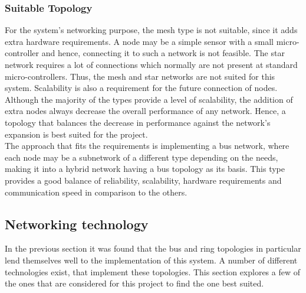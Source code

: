 \subsubsection*{Suitable Topology}
For the system's networking purpose, the mesh type is not suitable, since it adds extra hardware requirements.
A node may be a simple sensor with a small micro-controller and hence, connecting it to such a network is not feasible.
The star network requires a lot of connections which normally are not present at standard micro-controllers.
Thus, the mesh and star networks are not suited for this system.
Scalability is also a requirement for the future connection of nodes.
Although the majority of the types provide a level of scalability, the addition of extra nodes always decrease the overall performance of any network.
Hence, a topology that balances the decrease in performance against the network's expansion is best suited for the project.\\
The approach that fits the requirements is implementing a bus network, where each node may be a subnetwork of a different type depending on the needs, making it into a hybrid network having a bus topology as its basis.
This type provides a good balance of reliability, scalability, hardware requirements and communication speed in comparison to the others.
\subsection{Networking technology}
In the previous section it was found that the bus and ring topologies in particular lend themselves well to the implementation of this system.
A number of different technologies exist, that implement these topologies. 
This section explores a few of the ones that are considered for this project to find the one best suited.

